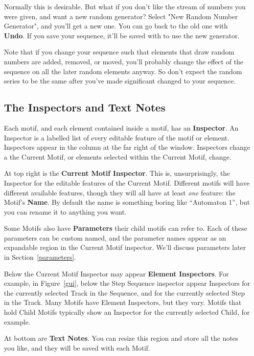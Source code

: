 \documentclass[twoside,10pt]{article}
\begin{document}
Normally this is desirable.  But what if you don't like the stream of numbers you were given, and want a new random generator?  Select "New Random Number Generator", and you'll get a new one.  You can go back to the old one with {\bf Undo}.  If you save your sequence, it'll be saved with to use the new generator.

Note that if you change your sequence such that elements that draw random numbers are added, removed, or moved, you'll probably change the effect of the sequence on all the later random elements anyway.  So don't expect the random series to be the same after you've made significant changed to your sequence.

\subsection{The Inspectors and Text Notes}

Each motif, and each element contained inside a motif, has an {\bf Inspector}.  An Inspector is a labelled list of every editable feature of the motif or element.  Inspectors appear in the column at the far right of the window.  Inspectors change a the Current Motif, or elements selected within the Current Motif, change.

At top right is the {\bf Current Motif Inspector}.  This is, unsurprisingly, the Inspector for the editable features of the Current Motif.  Different motifs will have different available features, though they will all have at least {\it one} feature: the Motif's {\bf Name}.  By default the name is something boring like ``Automaton 1'', but you can rename it to anything you want.

Some Motifs also have {\bf Parameters} their child motifs can refer to.  Each of these parameters can be custom named, and the parameter names appear as an expandable region in the Current Motif inspector.  We'll discuss parameters later in Section~\ref{parameters}.

Below the Current Motif Inspector may appear {\bf Element Inspectors}.  For example, in Figure~\ref{gui}, below the Step Sequence inspector appear Inspectors for the currently selected Track in the Sequence, and for the currently selected Step in the Track.  Many Motifs have Element Inspectors, but they vary.  Motifs that hold Child Motifs typically show an Inspector for the currently selected Child, for example.

At bottom are {\bf Text Notes}.  You can resize this region and store all the notes you like, and they will be saved with each Motif.
\end{document}
